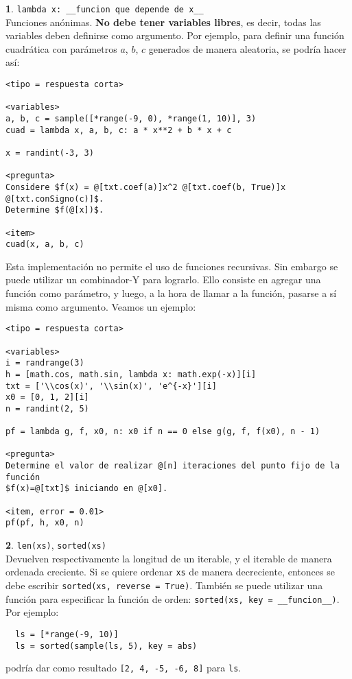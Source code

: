 \documentclass[12pt]{article}
\theoremstyle{definition}
\newtheorem{funcion}{}[section]
\begin{document}
\begin{funcion}
  \verb|lambda x: __funcion que depende de x__| \\[1ex]
  Funciones anónimas. \textbf{No debe tener variables libres}, es decir, todas las variables deben definirse como argumento. Por ejemplo, para definir una función cuadrática con parámetros $a$, $b$, $c$ generados de manera aleatoria, se podría hacer así:
\small
\begin{verbatim}
<tipo = respuesta corta>

<variables>
a, b, c = sample([*range(-9, 0), *range(1, 10)], 3)
cuad = lambda x, a, b, c: a * x**2 + b * x + c

x = randint(-3, 3)

<pregunta>
Considere $f(x) = @[txt.coef(a)]x^2 @[txt.coef(b, True)]x @[txt.conSigno(c)]$. 
Determine $f(@[x])$.

<item>
cuad(x, a, b, c)
\end{verbatim}
\normalsize

Esta implementación no permite el uso de funciones recursivas. Sin embargo se puede utilizar un combinador-Y para lograrlo. Ello consiste en agregar una función como parámetro, y luego, a la hora de llamar a la función, pasarse a sí misma como argumento. Veamos un ejemplo:

\small
\begin{verbatim}
<tipo = respuesta corta>

<variables>
i = randrange(3)
h = [math.cos, math.sin, lambda x: math.exp(-x)][i]
txt = ['\\cos(x)', '\\sin(x)', 'e^{-x}'][i]
x0 = [0, 1, 2][i]
n = randint(2, 5)

pf = lambda g, f, x0, n: x0 if n == 0 else g(g, f, f(x0), n - 1)

<pregunta>
Determine el valor de realizar @[n] iteraciones del punto fijo de la función 
$f(x)=@[txt]$ iniciando en @[x0].

<item, error = 0.01>
pf(pf, h, x0, n)
\end{verbatim}
\normalsize

\end{funcion}

\begin{funcion}
  \verb|len(xs)|, \verb|sorted(xs)| \\[1ex]
  Devuelven respectivamente la longitud de un iterable, y el iterable de manera ordenada creciente. Si se quiere ordenar \verb|xs| de manera decreciente, entonces se debe escribir \verb|sorted(xs, reverse = True)|. También se puede utilizar una función para especificar la función de orden: \newline
  \verb|sorted(xs, key = __funcion__)|. Por ejemplo:
  \small
  \begin{verbatim}
  ls = [*range(-9, 10)]
  ls = sorted(sample(ls, 5), key = abs)
  \end{verbatim}
  \normalsize
  podría dar como resultado \verb|[2, 4, -5, -6, 8]| para \verb|ls|.
\end{funcion}
\end{document}
